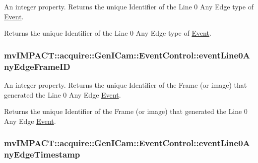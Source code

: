 An integer property. Returns the unique Identifier of the Line 0 Any Edge type of \hyperlink{classmv_i_m_p_a_c_t_1_1acquire_1_1_event}{Event}. 

Returns the unique Identifier of the Line 0 Any Edge type of \hyperlink{classmv_i_m_p_a_c_t_1_1acquire_1_1_event}{Event}. \hypertarget{classmv_i_m_p_a_c_t_1_1acquire_1_1_gen_i_cam_1_1_event_control_a778b223c6ffe62959922b1d1a0bc5ec2}{
\subsubsection[{event\+Line0\+Any\+Edge\+Frame\+I\+D}]{ mv\+I\+M\+P\+A\+C\+T\+::acquire\+::\+Gen\+I\+Cam\+::\+Event\+Control\+::event\+Line0\+Any\+Edge\+Frame\+I\+D}}\label{classmv_i_m_p_a_c_t_1_1acquire_1_1_gen_i_cam_1_1_event_control_a778b223c6ffe62959922b1d1a0bc5ec2}


An integer property. Returns the unique Identifier of the Frame (or image) that generated the Line 0 Any Edge \hyperlink{classmv_i_m_p_a_c_t_1_1acquire_1_1_event}{Event}. 

Returns the unique Identifier of the Frame (or image) that generated the Line 0 Any Edge \hyperlink{classmv_i_m_p_a_c_t_1_1acquire_1_1_event}{Event}. \hypertarget{classmv_i_m_p_a_c_t_1_1acquire_1_1_gen_i_cam_1_1_event_control_a80478b6a3c446bd2b821b11c46228039}{
\subsubsection[{event\+Line0\+Any\+Edge\+Timestamp}]{ mv\+I\+M\+P\+A\+C\+T\+::acquire\+::\+Gen\+I\+Cam\+::\+Event\+Control\+::event\+Line0\+Any\+Edge\+Timestamp}}\label{classmv_i_m_p_a_c_t_1_1acquire_1_1_gen_i_cam_1_1_event_control_a80478b6a3c446bd2b821b11c46228039}


